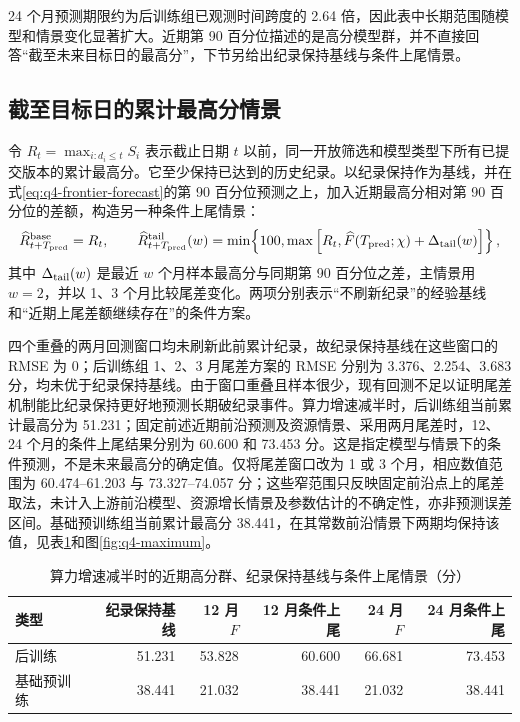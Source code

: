 24 个月预测期限约为后训练组已观测时间跨度的 2.64 倍，因此表中长期范围随模型和情景变化显著扩大。近期第 90 百分位描述的是高分模型群，并不直接回答“截至未来目标日的最高分”，下节另给出纪录保持基线与条件上尾情景。

\subsection{截至目标日的累计最高分情景}

令 $R_t=\max_{i:d_i\leq t}S_i$ 表示截止日期 $t$ 以前，同一开放筛选和模型类型下所有已提交版本的累计最高分。它至少保持已达到的历史纪录。以纪录保持作为基线，并在式\eqref{eq:q4-frontier-forecast}的第 90 百分位预测之上，加入近期最高分相对第 90 百分位的差额，构造另一种条件上尾情景：
\begin{equation}
 \widehat R^{\rm base}_{t+T_{\rm pred}}=R_t,\qquad
 \widehat R^{\rm tail}_{t+T_{\rm pred}}(w)=
 \min\!\left\{100,\max\left[R_t,
 \widehat F(T_{\rm pred};\chi)+\Delta_{\rm tail}(w)\right]\right\},
 \label{eq:q4-maximum}
\end{equation}
其中 $\Delta_{\rm tail}(w)$ 是最近 $w$ 个月样本最高分与同期第 90 百分位之差，主情景用 $w=2$，并以 1、3 个月比较尾差变化。两项分别表示“不刷新纪录”的经验基线和“近期上尾差额继续存在”的条件方案。

四个重叠的两月回测窗口均未刷新此前累计纪录，故纪录保持基线在这些窗口的 RMSE 为 0；后训练组 1、2、3 月尾差方案的 RMSE 分别为 3.376、2.254、3.683 分，均未优于纪录保持基线。由于窗口重叠且样本很少，现有回测不足以证明尾差机制能比纪录保持更好地预测长期破纪录事件。算力增速减半时，后训练组当前累计最高分为 51.231；固定前述近期前沿预测及资源情景、采用两月尾差时，12、24 个月的条件上尾结果分别为 60.600 和 73.453 分。这是指定模型与情景下的条件预测，不是未来最高分的确定值。仅将尾差窗口改为 1 或 3 个月，相应数值范围为 60.474--61.203 与 73.327--74.057 分；这些窄范围只反映固定前沿点上的尾差取法，未计入上游前沿模型、资源增长情景及参数估计的不确定性，亦非预测误差区间。基础预训练组当前累计最高分 38.441，在其常数前沿情景下两期均保持该值，见表\ref{tab:q4-maximum}和图\ref{fig:q4-maximum}。

\begin{table}[htbp]
 \centering\small
 \caption{算力增速减半时的近期高分群、纪录保持基线与条件上尾情景（分）}
 \label{tab:q4-maximum}
 \begin{tabular}{lrrrrr}
 \toprule
 类型 & 纪录保持基线 & 12 月 $F$ & 12 月条件上尾 & 24 月 $F$ & 24 月条件上尾\\
 \midrule
 后训练 & 51.231 & 53.828 & 60.600 & 66.681 & 73.453\\
 基础预训练 & 38.441 & 21.032 & 38.441 & 21.032 & 38.441\\
 \bottomrule
 \end{tabular}
\end{table}

